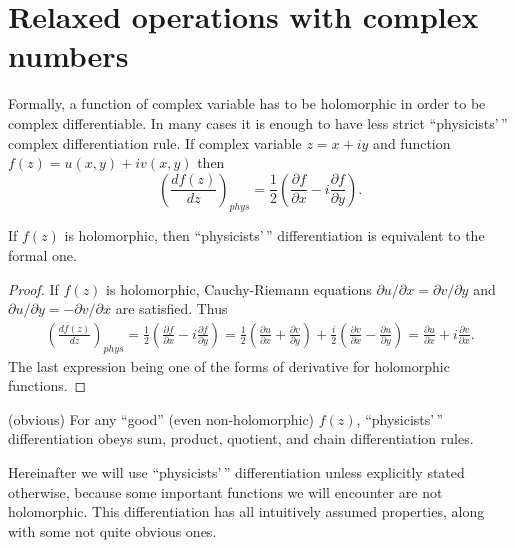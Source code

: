 \section{Relaxed operations with complex numbers}

Formally, a function of complex variable has to be holomorphic in order to be complex differentiable.
In many cases it is enough to have less strict ``physicists'\,'' complex differentiation rule.
If complex variable $z = x + iy$ and function $f(z) = u(x, y) + iv(x, y)$ then
\[
	\left( \frac{df(z)}{dz} \right)_{phys}
	= \frac{1}{2} \left(
		\frac{\partial f}{\partial x} - i \frac{\partial f}{\partial y}
	\right).
\]

\begin{lemma}
If $f(z)$ is holomorphic, then ``physicists'\,'' differentiation is equivalent to the formal one.
\end{lemma}
\begin{proof}
If $f(z)$ is holomorphic, Cauchy-Riemann equations $\partial u / \partial x = \partial v / \partial y$ and $\partial u / \partial y = -\partial v / \partial x$ are satisfied.
Thus
\begin{equation*}
\begin{split}
	\left( \frac{df(z)}{dz} \right)_{phys}
	= \frac{1}{2} \left(
		\frac{\partial f}{\partial x} - i \frac{\partial f}{\partial y}
	\right)
	= \frac{1}{2} \left(
		\frac{\partial u}{\partial x} + \frac{\partial v}{\partial y}
	\right)
	+ \frac{i}{2} \left(
		\frac{\partial v}{\partial x} - \frac{\partial u}{\partial y}
	\right)
	= \frac{\partial u}{\partial x} + i \frac{\partial v}{\partial x}.
\end{split}
\end{equation*}
The last expression being one of the forms of derivative for holomorphic functions.
\end{proof}

\begin{lemma}
(obvious) For any ``good'' (even non-holomorphic) $f(z)$, ``physicists'\,'' differentiation obeys sum, product, quotient, and chain differentiation rules.
\end{lemma}

Hereinafter we will use ``physicists'\,'' differentiation unless explicitly stated otherwise,
because some important functions we will encounter are not holomorphic.
This differentiation has all intuitively assumed properties, along with some not quite obvious ones.

